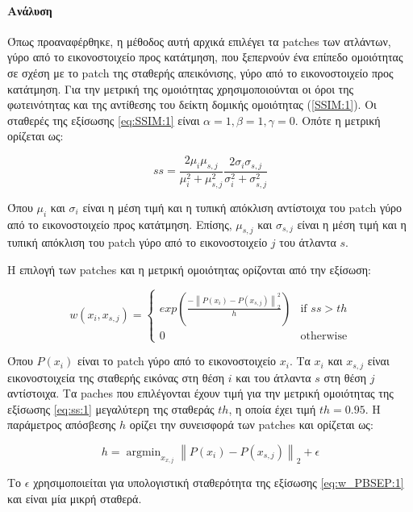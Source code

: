 \documentclass[a4paper,12pt]{article}
\newcommand{\paragraphLine}[1]{\paragraph{#1}\mbox{}}
\newcommand{\argminB}{\mathop{\mathrm{argmin}}}
\newcommand\norm[1]{\left\lVert#1\right\rVert}
\begin{document}
\paragraphLine{Ανάλυση}

Όπως προαναφέρθηκε, η μέθοδος αυτή αρχικά επιλέγει τα patches των ατλάντων, γύρο
από το εικονοστοιχείο προς κατάτμηση, που ξεπερνούν ένα επίπεδο ομοιότητας σε
σχέση με το patch της σταθερής απεικόνισης, γύρο από το εικονοστοιχείο προς
κατάτμηση. Για την μετρική της ομοιότητας χρησιμοποιούνται οι όροι της
φωτεινότητας και της αντίθεσης του δείκτη δομικής ομοιότητας (\ref{SSIM:1}). Οι
σταθερές της εξίσωσης \eqref{eq:SSIM:1} είναι $\alpha = 1, \beta = 1, \gamma =
0$. Οπότε η μετρική ορίζεται ως:

\begin{equation} \label{eq:ss:1}
    ss = \frac {2 \mu_i \mu_{s,j}} {\mu_i^2 + \mu_{s,j}^2} 
         \frac {2 \sigma_i \sigma_{s,j}} {\sigma_i^2 + \sigma_{s,j}^2}
\end{equation}

Όπου $\mu_i$ και $\sigma_i$ είναι η μέση τιμή και η τυπική απόκλιση αντίστοιχα
του patch γύρο από το εικονοστοιχείο προς κατάτμηση. Επίσης, $\mu_{s,j}$ και
$\sigma_{s,j}$ είναι η μέση τιμή και η τυπική απόκλιση του patch γύρο από το
εικονοστοιχείο $j$ του άτλαντα $s$.

Η επιλογή των patches και η μετρική ομοιότητας ορίζονται από την εξίσωση:

\begin{equation} \label{eq:w_PBSEP:1}
    w(x_i, x_{s,j}) = 
    \begin{cases}
        exp\left( \frac {- \norm{P(x_i) - P(x_{s,j})}_2^2 } {h} \right)
            & \text{if } ss > th\\
        0   & \text{otherwise}
    \end{cases}
\end{equation}

Όπου $P(x_i)$ είναι το patch γύρο από το εικονοστοιχείο $x_i$. Τα $x_i$ και
$x_{s,j}$ είναι εικονοστοιχεία της σταθερής εικόνας στη θέση $i$ και του άτλαντα
$s$ στη θέση $j$ αντίστοιχα. Τα paches που επιλέγονται έχουν τιμή για την
μετρική ομοιότητας της εξίσωσης \eqref{eq:ss:1} μεγαλύτερη της σταθεράς $th$, η
οποία έχει τιμή $th = 0.95$. Η παράμετρος απόσβεσης $h$ ορίζει την συνεισφορά
των patches και ορίζεται ως:

\begin{equation*} 
    h = \argminB_{x_{x,j}} \norm{P(x_i) - P(x_{s,j})}_2 + \epsilon
\end{equation*}

Το $\epsilon$ χρησιμοποιείται για υπολογιστική σταθερότητα της εξίσωσης
\eqref{eq:w_PBSEP:1} και είναι μία μικρή σταθερά.
\end{document}
